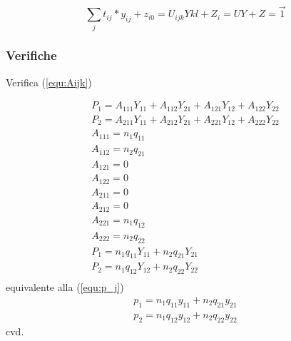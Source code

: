 \documentclass[a4paper,11pt]{article}
\begin{document}
\begin{equation}
	\sum_j t_{ij} * y_{ij} + z_{i0} = U_{ijk} Y{kl} + Z_i = U Y + Z = \vec{1}
\end{equation}


\subsubsection{Verifiche}

Verifica (\ref{equ:Aijk})

\[
\begin{array}{ll}
P_1 = A_{111}Y_{11} + A_{112}Y_{21} +
A_{121}Y_{12} + A_{122}Y_{22} \\
P_2 = A_{211}Y_{11} + A_{212}Y_{21} +
A_{221}Y_{12} + A_{222}Y_{22} \\

A_{111} = n_1 q_{11} \\
A_{112} = n_2 q_{21} \\
A_{121} = 0 \\
A_{122} = 0 \\
A_{211} = 0 \\
A_{212} = 0 \\
A_{221} = n_1 q_{12} \\
A_{222} = n_2 q_{22} \\

P_1 = n_1 q_{11}Y_{11} + n_2 q_{21}Y_{21} \\
P_2 = n_1 q_{12}Y_{12} + n_2 q_{22}Y_{22} \\
\end{array}
\]
equivalente alla (\ref{equ:p_j})
\[
\begin{array}{ll}
p_1 = n_1 q_{11} y_{11} + n_2 q_{21} y_{21} \\
p_2 = n_1 q_{12} y_{12} + n_2 q_{22} y_{22}
\end{array}
\]
cvd.
\end{document}
